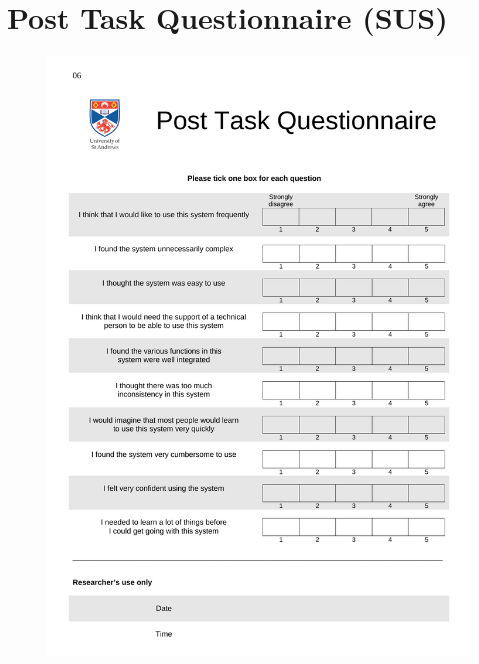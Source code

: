 \documentclass[oneside]{book}
\begin{document}
\chapter{Post Task Questionnaire (SUS)}
\label{sus}
\begin{figure}[h]
	\begin{center}
		\includegraphics[width=0.7\linewidth]{PDFs/Post_Task_Questionnaire.pdf}
	\end{center}
\end{figure}
\end{document}
